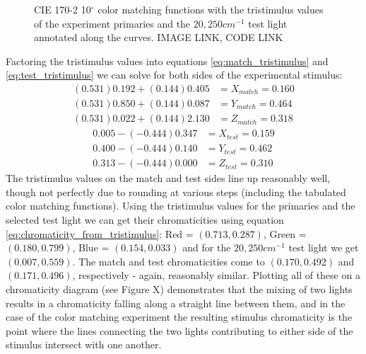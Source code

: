 \documentclass[twocolumn]{article}
\newif\ifinvert
\begin{document}
\begin{figure*}[h]
    \ifinvert
        
    \else
        
    \fi
    \caption{CIE 170-2 10$^\circ$ color matching functions with the tristimulus values of the experiment primaries and the $20,250cm^{-1}$ test light annotated along the curves.  IMAGE LINK, CODE LINK}\label{fig:color_matching_experiment_tristimulus}
\end{figure*}
Factoring the tristimulus values into equations \ref{eq:match_tristimulus} and \ref{eq:test_tristimulus} we can solve for both sides of the experimental stimulus:
\begin{equation}
    \begin{aligned}
        (0.531)0.192+(0.144)0.405&=X_{match}=0.160\\
        (0.531)0.850+(0.144)0.087&=Y_{match}=0.464\\
        (0.531)0.022+(0.144)2.130&=Z_{match}=0.318
    \end{aligned}
\end{equation}
\begin{equation}
    \begin{aligned}
        0.005-(-0.444)0.347&=X_{test}=0.159\\
        0.400-(-0.444)0.140&=Y_{test}=0.462\\
        0.313-(-0.444)0.000&=Z_{test}=0.310
    \end{aligned}
\end{equation}
The tristimulus values on the match and test sides line up reasonably well, though not perfectly due to rounding at various steps (including the tabulated color matching functions).  Using the tristimulus values for the primaries and the selected test light we can get their chromaticities using equation \ref{eq:chromaticity_from_tristimulus}: Red = $(0.713,0.287)$, Green = $(0.180,0.799)$, Blue = $(0.154,0.033)$ and for the $20,250cm^{-1}$ test light we get $(0.007,0.559)$.  The match and test chromaticities come to $(0.170,0.492)$ and $(0.171,0.496)$, respectively - again, reasonably similar.  Plotting all of these on a chromaticity diagram (see Figure X) demonstrates that the mixing of two lights results in a chromaticity falling along a straight line between them, and in the case of the color matching experiment the resulting stimulus chromaticity is the point where the lines connecting the two lights contributing to either side of the stimulus intersect with one another.
\end{document}
